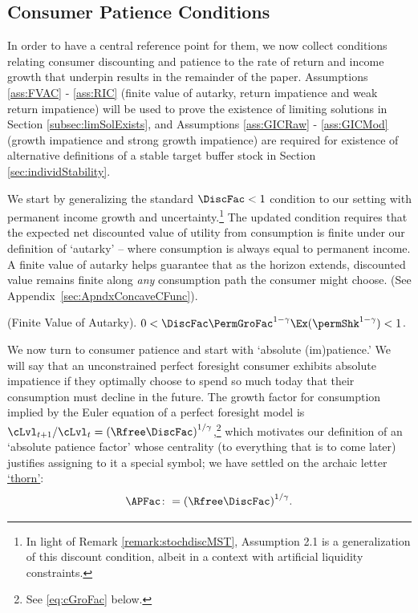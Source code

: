 \documentclass[BufferStockTheory]{subfiles}
\begin{document}
\hypertarget{GICTheorySetup}{}
\subsection{Consumer Patience Conditions}\label{subsec:GICTheorySetup}

In order to have a central reference point for them, we now collect conditions relating consumer discounting and patience to the rate of return and income growth that underpin results in the remainder of the paper.
Assumptions \ref{ass:FVAC} - \ref{ass:RIC}  (finite value of autarky, return impatience and weak return impatience) will be used to prove the existence of limiting solutions in Section \ref{subsec:limSolExists}, and Assumptions \ref{ass:GICRaw} - \ref{ass:GICMod} (growth impatience and strong growth impatience) are required for existence of alternative definitions of a stable target buffer stock in Section \ref{sec:individStability}.


We start by generalizing the standard $\DiscFac<1$ condition to our setting with permanent income growth and uncertainty.\footnote{In light of Remark \ref{remark:stochdiscMST}, \cite{mstIncFluct} Assumption 2.1 is a generalization of this discount condition, albeit in a context with artificial liquidity constraints.} The updated condition requires that the expected net discounted value of utility from consumption is finite under our definition of `autarky' -- where consumption is always equal to permanent income.
A finite value of autarky helps guarantee that as the horizon extends, discounted value remains finite along \textit{any} consumption path the consumer might choose.
(See Appendix~\ref{sec:ApndxConcaveCFunc}).





\hypertarget{FVAC}{}
\begin{assumL}\label{ass:FVAC}(Finite Value of Autarky). 
%
$0 < \DiscFac \PermGroFac^{1-\CRRA}\Ex(\permShk^{1-\CRRA}) < 1 $.
%
\end{assumL}


We now turn to consumer patience and start with `absolute (im)patience.'
We will say that an unconstrained perfect foresight consumer exhibits absolute impatience if they optimally choose to spend so much today that their consumption must decline in the future.
The growth factor for consumption implied by the Euler equation of a perfect foresight model is $\cLvl_{t+1}/\cLvl_{t} = {(\Rfree\DiscFac)}^{1/\CRRA}$,\footnote{See \eqref{eq:cGroFac} below.} which motivates our definition of an `absolute patience factor' whose centrality (to everything that is to come later) justifies assigning to it a special symbol; we have settled on the archaic letter \href{https://en.wikipedia.org/wiki/Thorn_(letter)}{`thorn'}:
\hypertarget{APFac}{}
\begin{equation}\label{eq:APFac}
    \APFac \colon= {(\Rfree\DiscFac)}^{1/\CRRA}.
\end{equation}
\end{document}
